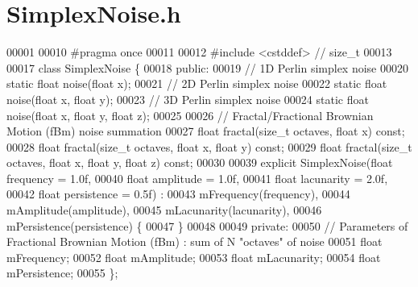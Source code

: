 \section{Simplex\+Noise.\+h}
\label{_simplex_noise_8h_source}

\begin{DoxyCode}
00001 
00010 \textcolor{preprocessor}{#pragma once}
00011 
00012 \textcolor{preprocessor}{#include <cstddef>}  \textcolor{comment}{// size\_t}
00013 
00017 \textcolor{keyword}{class }SimplexNoise \{
00018 \textcolor{keyword}{public}:
00019     \textcolor{comment}{// 1D Perlin simplex noise}
00020     \textcolor{keyword}{static} \textcolor{keywordtype}{float} noise(\textcolor{keywordtype}{float} x);
00021     \textcolor{comment}{// 2D Perlin simplex noise}
00022     \textcolor{keyword}{static} \textcolor{keywordtype}{float} noise(\textcolor{keywordtype}{float} x, \textcolor{keywordtype}{float} y);
00023     \textcolor{comment}{// 3D Perlin simplex noise}
00024     \textcolor{keyword}{static} \textcolor{keywordtype}{float} noise(\textcolor{keywordtype}{float} x, \textcolor{keywordtype}{float} y, \textcolor{keywordtype}{float} z);
00025 
00026     \textcolor{comment}{// Fractal/Fractional Brownian Motion (fBm) noise summation}
00027     \textcolor{keywordtype}{float} fractal(\textcolor{keywordtype}{size\_t} octaves, \textcolor{keywordtype}{float} x) \textcolor{keyword}{const};
00028     \textcolor{keywordtype}{float} fractal(\textcolor{keywordtype}{size\_t} octaves, \textcolor{keywordtype}{float} x, \textcolor{keywordtype}{float} y) \textcolor{keyword}{const};
00029     \textcolor{keywordtype}{float} fractal(\textcolor{keywordtype}{size\_t} octaves, \textcolor{keywordtype}{float} x, \textcolor{keywordtype}{float} y, \textcolor{keywordtype}{float} z) \textcolor{keyword}{const};
00030 
00039     \textcolor{keyword}{explicit} SimplexNoise(\textcolor{keywordtype}{float} frequency = 1.0f,
00040                           \textcolor{keywordtype}{float} amplitude = 1.0f,
00041                           \textcolor{keywordtype}{float} lacunarity = 2.0f,
00042                           \textcolor{keywordtype}{float} persistence = 0.5f) :
00043         mFrequency(frequency),
00044         mAmplitude(amplitude),
00045         mLacunarity(lacunarity),
00046         mPersistence(persistence) \{
00047     \}
00048 
00049 \textcolor{keyword}{private}:
00050     \textcolor{comment}{// Parameters of Fractional Brownian Motion (fBm) : sum of N "octaves" of noise}
00051     \textcolor{keywordtype}{float} mFrequency;   
00052     \textcolor{keywordtype}{float} mAmplitude;   
00053     \textcolor{keywordtype}{float} mLacunarity;  
00054     \textcolor{keywordtype}{float} mPersistence; 
00055 \};
\end{DoxyCode}
